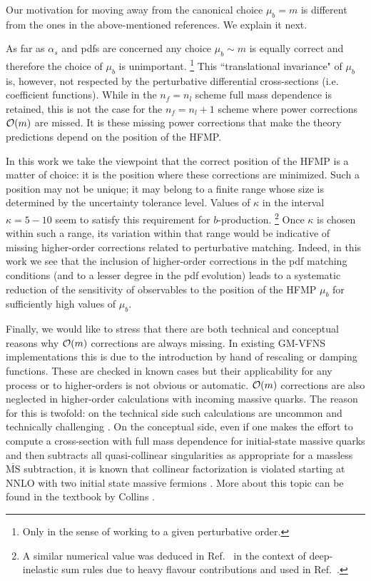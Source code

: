\documentclass[letter,11pt]{article}
\def\as{\alpha_s}
\def\nf{{n_f}}
\def\nl{{n_l}}
\def\MSbar{\overline{\mathrm{MS}}}
\def\mub{\mu_b}
\begin{document}
Our motivation for moving away from the canonical choice $\mub=m$ is different from the ones in the above-mentioned references. We explain it next.

As far as $\as$ and pdfs are concerned any choice $\mub\sim m$ is equally correct and therefore the choice of $\mub$ is unimportant.
%
\footnote{Only in the sense of working to a given perturbative order.}
%
This ``translational invariance" of $\mub$ is, however, not respected by the perturbative differential cross-sections (i.e. coefficient functions). While in the $\nf=\nl$ scheme full mass dependence is retained, this is not the case for the $\nf=\nl+1$ scheme where power corrections ${\cal O}(m)$ are missed. It is these missing power corrections that make the theory predictions depend on the position of the HFMP.

In this work we take the viewpoint that the correct position of the HFMP is a matter of choice: it is the position where these corrections are minimized. Such a position may not be unique; it may belong to a finite range whose size is determined by the uncertainty tolerance level. Values of $\kappa$ in the interval $\kappa=5-10$ seem to satisfy this requirement for $b$-production.
%
\footnote{A similar numerical value was deduced in Ref.~\cite{Blumlein:1998sh} in the context of deep-inelastic sum rules due to heavy flavour contributions and used in Ref.~\cite{Kataev:2001kk}.}
%
Once $\kappa$ is chosen within such a range, its variation within that range would be indicative of missing higher-order corrections related to perturbative matching. Indeed, in this work we see that the inclusion of higher-order corrections in the pdf matching conditions (and to a lesser degree in the pdf evolution) leads to a systematic reduction of the sensitivity of observables to the position of the HFMP $\mub$ for sufficiently high values of $\mub$.

Finally, we would like to stress that there are both technical and conceptual reasons why ${\cal O}(m)$ corrections are always missing. In existing GM-VFNS implementations this is due to the introduction by hand of rescaling or damping functions. These are checked in known cases but their applicability for any process or to higher-orders is not obvious or automatic. ${\cal O}(m)$ corrections are also neglected in higher-order calculations with incoming massive quarks. The reason for this is twofold: on the technical side such calculations are uncommon and technically challenging \cite{Kretzer:1998ju}. On the conceptual side, even if one makes the effort to compute a cross-section with full mass dependence for initial-state massive quarks and then subtracts all quasi-collinear singularities as appropriate for a massless $\MSbar$ subtraction, it is known that collinear factorization is violated starting at NNLO with two initial state massive fermions \cite{Doria:1980ak,DiLieto:1980nkq,Catani:1985xt}. More about this topic can be found in the textbook by Collins \cite{Collins:2011zzd}.
\end{document}
